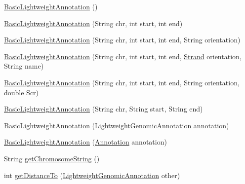 \begin{DoxyCompactItemize}
\item 
\hyperlink{classbroad_1_1core_1_1annotation_1_1_basic_lightweight_annotation_abdcee6e77b0d127590da904a1afa1fc5}{Basic\+Lightweight\+Annotation} ()
\item 
\hyperlink{classbroad_1_1core_1_1annotation_1_1_basic_lightweight_annotation_af8b11d7c42808dca3362cce37f69144d}{Basic\+Lightweight\+Annotation} (String chr, int start, int end)
\item 
\hyperlink{classbroad_1_1core_1_1annotation_1_1_basic_lightweight_annotation_a11c8f9d49616210935e63f00289ca56c}{Basic\+Lightweight\+Annotation} (String chr, int start, int end, String orientation)
\item 
\hyperlink{classbroad_1_1core_1_1annotation_1_1_basic_lightweight_annotation_a0cc60757dcce8587490d159ce0a9d037}{Basic\+Lightweight\+Annotation} (String chr, int start, int end, \hyperlink{enumumms_1_1core_1_1annotation_1_1_annotation_1_1_strand}{Strand} orientation, String name)
\item 
\hyperlink{classbroad_1_1core_1_1annotation_1_1_basic_lightweight_annotation_af19196d2c65be24cda015ac1b0777312}{Basic\+Lightweight\+Annotation} (String chr, int start, int end, String orientation, double Scr)
\item 
\hyperlink{classbroad_1_1core_1_1annotation_1_1_basic_lightweight_annotation_a5347e324ef81c16d88b70c88097377bc}{Basic\+Lightweight\+Annotation} (String chr, String start, String end)
\item 
\hyperlink{classbroad_1_1core_1_1annotation_1_1_basic_lightweight_annotation_af2d2e1efe40a87dd95af968bb0ee20b0}{Basic\+Lightweight\+Annotation} (\hyperlink{interfacebroad_1_1core_1_1annotation_1_1_lightweight_genomic_annotation}{Lightweight\+Genomic\+Annotation} annotation)
\item 
\hyperlink{classbroad_1_1core_1_1annotation_1_1_basic_lightweight_annotation_a8b39886af98fc35216f4012599060bff}{Basic\+Lightweight\+Annotation} (\hyperlink{interfaceumms_1_1core_1_1annotation_1_1_annotation}{Annotation} annotation)
\item 
String \hyperlink{classbroad_1_1core_1_1annotation_1_1_basic_lightweight_annotation_a713c14e80c68be53c7175c08a4042f10}{get\+Chromosome\+String} ()
\item 
int \hyperlink{classbroad_1_1core_1_1annotation_1_1_basic_lightweight_annotation_a944575391d1ef0c562e3beeb4d493925}{get\+Distance\+To} (\hyperlink{interfacebroad_1_1core_1_1annotation_1_1_lightweight_genomic_annotation}{Lightweight\+Genomic\+Annotation} other)

\end{DoxyCompactItemize}
